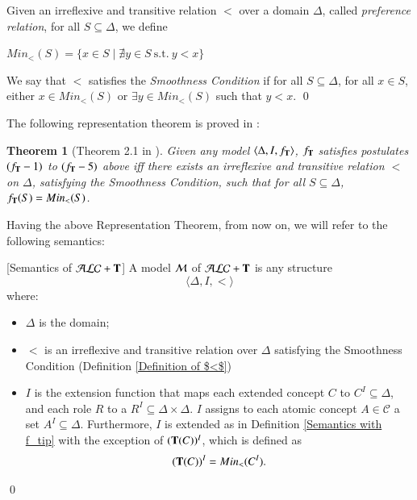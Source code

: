 \documentclass[a4paper, 11pt, oneside]{elsarticle}
\newcommand{\tip}{{\bf T}}
\newcommand{\alct}{\mathcal{ALC}+\tip}
\newcommand{\tc} {\mid}
\newcommand{\emme} {\begin{mathcal}M\end{mathcal}}
\newenvironment{definition}
{\begin{defi} \rm}{\qed \end{defi}}
\newtheorem{theorem}{Theorem}
\newcounter{posu}
\newtheorem{theorem}[posu]{Theorem}
\newtheorem{definition}[posu]{Definition}
\begin{document}
\begin{definition}\label{Definition of $<$} Given an irreflexive and transitive relation  $<$ over a domain $\Delta$, called \emph{preference relation}, for all $S \subseteq \Delta$, we define

$Min_<(S)= \{x \in S \tc \nexists y \in S \ \mbox{s.t.} \ y < x \}$

\noindent We say that $<$ satisfies the {\em Smoothness Condition} if for all $S \subseteq \Delta$, for all $x \in S$, either $x \in Min_<(S)$ or $\exists y \in  Min_<(S)$ such that $y < x$.
\end{definition}

\noindent The following representation theorem is proved in \cite{FI09}:

\begin{theorem}[Theorem 2.1 in \cite{FI09}]\label{rtrt} Given any model $\langle \Delta, I, f_\tip
\rangle$, $f_\tip$ satisfies postulates $(f_\tip-1)$ to $(f_\tip-5)$ above iff there exists  an irreflexive and transitive relation $<$ on $\Delta$, satisfying the Smoothness Condition, such that for all $S \subseteq \Delta$, $f_\tip(S) = Min_<(S)$.
\end{theorem}


\noindent Having the above Representation Theorem, from now on, we will refer to the following semantics:

\begin{definition}[Semantics of $\alct$]\label{Semantics of T} A model $\emme$ of $\alct$ is any structure $$\langle \Delta, I, < \rangle$$ where:

\begin{itemize}

\item $\Delta$ is the domain;

\item $<$ is an irreflexive and transitive relation over $\Delta$ satisfying the Smoothness Condition (Definition \ref{Definition of $<$})

\item $I$ is the extension function that maps each  extended concept $C$ to $C^I \subseteq \Delta$, and each role $R$ to a $R^I \subseteq \Delta \times \Delta$.
$I$ assigns to each atomic concept $A \in \mathcal{C}$ a set $A^I \subseteq \Delta$.
Furthermore, $I$ is extended as in Definition \ref{Semantics with f_tip} with the exception of $(\tip(C))^I$, which is defined as $$(\tip(C))^I = Min_<(C^I).$$
\end{itemize}

\end{definition}
\end{document}
